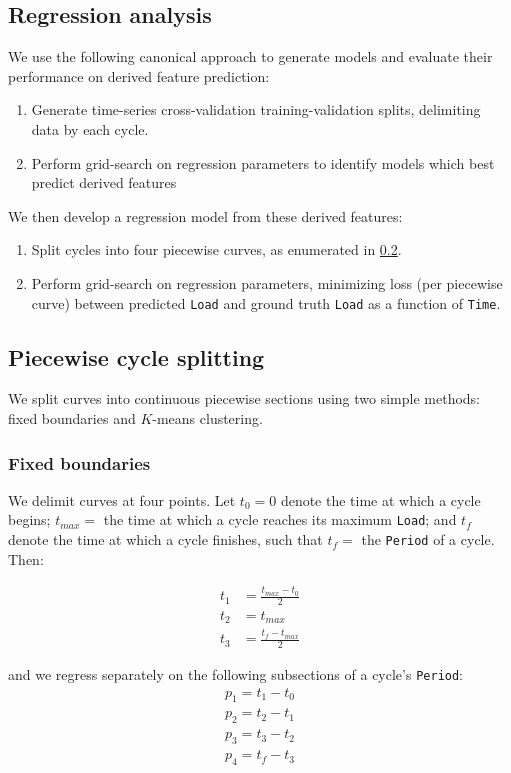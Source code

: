 \documentclass[letterpaper, 10 pt, conference]{ieeeconf}  %
\begin{document}
\subsection{Regression analysis}
We use the following canonical approach to generate models and evaluate their performance on derived feature prediction:
\begin{enumerate}
  \item Generate time-series cross-validation training-validation splits, delimiting data by each cycle.
  \item Perform grid-search on regression parameters to identify models which best predict derived features
\end{enumerate}

We then develop a regression model from these derived features:
\begin{enumerate}
  \item Split cycles into four piecewise curves, as enumerated in \ref{ssec:Piecewise}.
  \item Perform grid-search on regression parameters, minimizing loss (per piecewise curve) between predicted \verb|Load| and ground truth \verb|Load| as a function of \verb|Time|. 
\end{enumerate}

\subsection{Piecewise cycle splitting}\label{ssec:Piecewise}
We split curves into continuous piecewise sections using two simple methods: fixed boundaries and $K$-means clustering.

\subsubsection{Fixed boundaries}
We delimit curves at four points. Let $t_0 = 0$ denote the time at which a cycle begins; $t_{max} =$ the time at which a cycle reaches its maximum \verb|Load|; and $t_f$ denote the time at which a cycle finishes, such that $t_f =$ the \verb|Period| of a cycle. Then:

\begin{align*}
  t_1 &= \frac{t_{max} - t_0}{2} \\
  t_2 &= t_{max} \\
  t_3 &= \frac{t_f - t_{max}}{2}
\end{align*}

and we regress separately on the following subsections of a cycle's \verb|Period|:
\begin{align*}
  p_1 = t_1 - t_0 \\
  p_2 = t_2 - t_1 \\
  p_3 = t_3 - t_2 \\
  p_4 = t_f - t_3
\end{align*}
\end{document}
